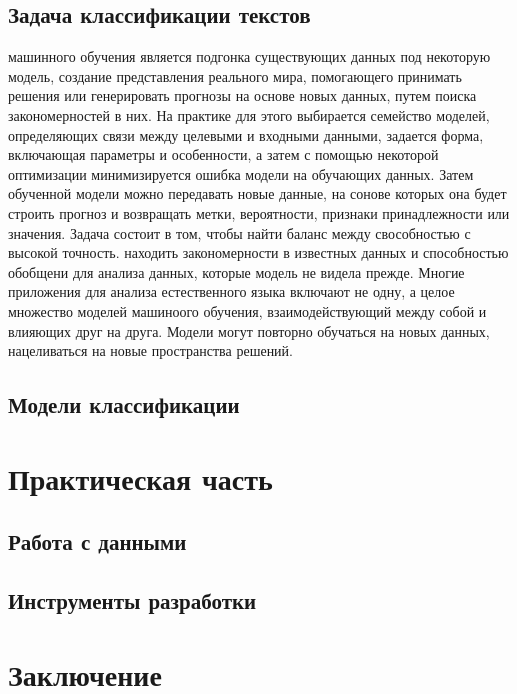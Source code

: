\documentclass{article}
\newcommand\tab[1][1cm]{\hspace*{#1}}
\begin{document}
\subsection{Задача классификации текстов}
 машинного обучения является подгонка существующих данных под некоторую модель, создание представления реального мира, помогающего прини­мать решения или генерировать прогнозы на основе новых данных, путем поиска закономерностей в них. На практике для этого выбирается семейство моделей, определяющих связи между целевыми и входными данными, задается форма, включающая параметры и особенности, а затем с помощью некоторой оптимизации минимизируется ошибка модели на обучающих данных. Затем обученной модели можно передавать новые данные, на сонове которых она будет строить прогноз и возвращать метки, вероятности, признаки принадлежности или значения. Задача состоит в том, чтобы найти баланс между свособностью с высокой точность. находить закономерности в известных данных и способностью обобщени для анализа данных, которые модель не видела прежде. Многие приложения для анализа естественного языка включают не одну, а целое множество моделей машиноого обучения, взаимодействующий между собой и влияющих друг на друга. Модели могут повторно обучаться на новых данных, нацеливаться на новые пространства решений.
\newpage
\subsection{Модели классификации}
\newpage
\section{Практическая часть}
\subsection{Работа с данными}
\newpage
\subsection{Инструменты разработки}
\newpage
{}
\section*{Заключение}
\newpage
{}
\end{document}
